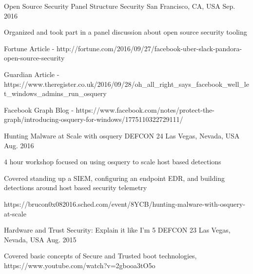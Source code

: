 \begin{cventries}

\cventry
{Open Source Security Panel} %
{Structure Security} %
{San Francisco, CA, USA} %
{Sep. 2016} %
{ %
\begin{cvitems}
\item {Organized and took part in a panel discussion about open source security tooling}
\item {Fortune Article - http://fortune.com/2016/09/27/facebook-uber-slack-pandora-open-source-security}
\item {Guardian Article - https://www.theregister.co.uk/2016/09/28/oh\_all\_right\_says\_facebook\_well\_let\_windows\_admins\_run\_osquery}
\item {Facebook Graph Blog - https://www.facebook.com/notes/protect-the-graph/introducing-osquery-for-windows/1775110322729111/}
\end{cvitems}
}


\cventry
{Hunting Malware at Scale with osquery} %
{DEFCON 24} %
{Las Vegas, Nevada, USA} %
{Aug. 2016} %
{ %
\begin{cvitems}
\item {4 hour workshop focused on using osquery to scale host based detections}
\item {Covered standing up a SIEM, configuring an endpoint EDR, and building detections around host based security telemetry}
\item {https://brucon0x082016.sched.com/event/8YCB/hunting-malware-with-osquery-at-scale}
\end{cvitems}
}


\cventry
{Hardware and Trust Security: Explain it like I’m 5} %
{DEFCON 23} %
{Las Vegas, Nevada, USA} %
{Aug. 2015} %
{ %
\begin{cvitems}
\item {Covered basic concepts of Secure and Trusted boot technologies, https://www.youtube.com/watch?v=2gbooa3tO5o}
\end{cvitems}
}


\end{cventries}